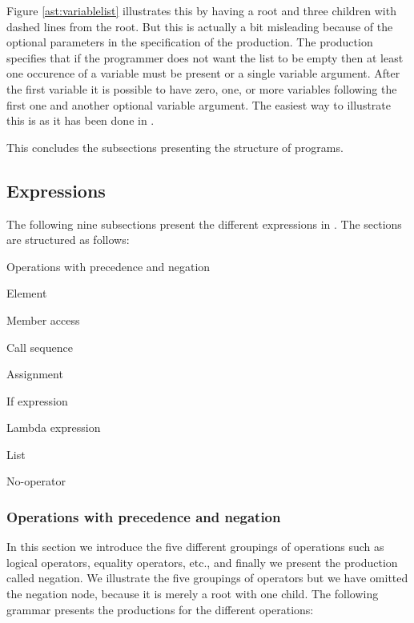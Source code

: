 

Figure \ref{ast:variablelist} illustrates this by having a root and three
children with dashed lines from the root. But this is actually a bit misleading
because of the optional parameters in the specification of the production. The
production specifies that if the programmer does not want the list to be empty
then at least one occurence of a variable must be present or a single variable
argument. After the first variable it is possible to have zero, one, or more
variables following the first one and another optional variable argument. The
easiest way to illustrate this is as it has been done in
.

This concludes the subsections presenting the structure of programs.

\subsection{Expressions}
The following nine subsections present the different expressions in
\productname{}. The sections are structured as follows:

\begin{dlist}
  \item Operations with precedence and negation
  \item Element
  \item Member access
  \item Call sequence
  \item Assignment
  \item If expression
  \item Lambda expression
  \item List
  \item No-operator
\end{dlist}

\subsubsection{Operations with precedence and negation}
In this section we introduce the five different groupings of operations such as
logical operators, equality operators, etc., and finally we present the
production called negation. We illustrate the five groupings of operators but we
have omitted the negation node, because it is merely a root with one child. The
following grammar presents the productions for the different operations:

\begin{ebnf}
\end{ebnf}

